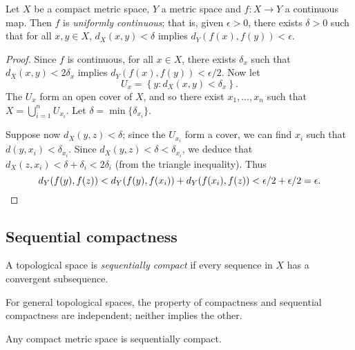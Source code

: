 \begin{proposition}
	Let $X$ be a compact metric space, $Y$ a metric space and $f:X \to Y$ a continuous map. Then $f$ is \emph{uniformly continuous}; that is, given $\epsilon>0$, there exists $\delta>0$ such that for all $x,y\in X$, $d_X(x,y) < \delta$ implies $d_Y(f(x),f(y))<\epsilon$.
\end{proposition}

\begin{proof}
	Since $f$ is continuous, for all $x\in X$, there exists $\delta_x$ such that $d_X(x,y) < 2\delta_x$ implies $d_Y(f(x),f(y)) < \epsilon/2$. Now let
	\begin{equation*}
		U_x = \left\{y: d_X(x,y) < \delta_x \right\}.
	\end{equation*}
	The $U_x$ form an open cover of $X$, and so there exist $x_1,\ldots,x_n$ such that $X=\bigcup_{i=1}^n U_{x_i}$. Let $\delta=\min\{\delta_{x_i}\}$.

	Suppose now $d_X(y,z) < \delta$; since the $U_{x_i}$ form a cover, we can find $x_i$ such that $d(y,x_i) < \delta_{x_i}$. Since $d_X(y,z) < \delta<\delta_{x_i}$, we deduce that $d_X(z,x_i) < \delta + \delta_i < 2\delta_i$ (from the triangle inequality). Thus
	\begin{equation*}
		d_Y(f(y),f(z))
		< d_Y(f(y),f(x_i)) + d_Y(f(x_i),f(z))
		< \epsilon/2 + \epsilon/2
		= \epsilon. \qedhere
	\end{equation*}
\end{proof}


\subsection{Sequential compactness} %
\label{sub:sequential_compactness}

\begin{definition}
	A topological space is \emph{sequentially compact} if every sequence in $X$ has a convergent subsequence.
\end{definition}

\vspace{3pt}

\begin{remark}
	For general topological spaces, the property of compactness and sequential compactness are independent; neither implies the other.
\end{remark}

\begin{proposition}
	Any compact metric space is sequentially compact.
\end{proposition}

